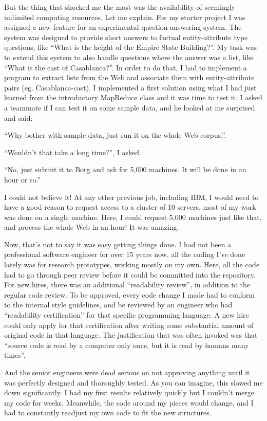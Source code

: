 \documentclass[12pt]{book}
\begin{document}
But the thing that shocked me the most was the availability of seemingly
unlimited computing resources. Let me explain. For my starter project I
was assigned a new feature for an experimental question-answering
system. The system was designed to provide short answers to factual
entity-attribute type questions, like ``What is the height of the Empire
State Building?''. My task was to extend this system to also handle
questions where the answer was a list, like ``What is the cast of
Casablanca?''. In order to do that, I had to implement a program to
extract lists from the Web and associate them with entity-attribute
pairs (eg. Casablanca-cast). I implemented a first solution using what I
had just learned from the introductory MapReduce class and it was time
to test it. I asked a teammate if I can test it on some sample data, and
he looked at me surprised and said:

``Why bother with sample data, just run it on the whole Web corpus.''.

``Wouldn't that take a long time?'', I asked.

``No, just submit it to Borg and ask for 5,000 machines. It will be done
in an hour or so.''

I could not believe it! At any other previous job, including IBM, I
would need to have a good reason to request access to a cluster of 10
servers, most of my work was done on a single machine. Here, I could
request 5,000 machines just like that, and process the whole Web in an
hour! It was amazing.

Now, that's not to say it was easy getting things done. I had not been a
professional software engineer for over 15 years now, all the coding
I've done lately was for research prototypes, working mostly on my own.
Here, all the code had to go through peer review before it could be
committed into the repository. For new hires, there was an additional
``readability review'', in addition to the regular code review. To be
approved, every code change I made had to conform to the internal style
guidelines, and be reviewed by an engineer who had ``readability
certification'' for that specific programming language. A new hire could
only apply for that certification after writing some substantial amount
of original code in that language. The justification that was often
invoked was that ``source code is read by a computer only once, but it
is read by humans many times''.

And the senior engineers were dead serious on not approving anything
until it was perfectly designed and thoroughly tested. As you can
imagine, this slowed me down significantly. I had my first results
relatively quickly but I couldn't merge my code for weeks. Meanwhile,
the code around my pieces would change, and I had to constantly readjust
my own code to fit the new structures.
\end{document}

